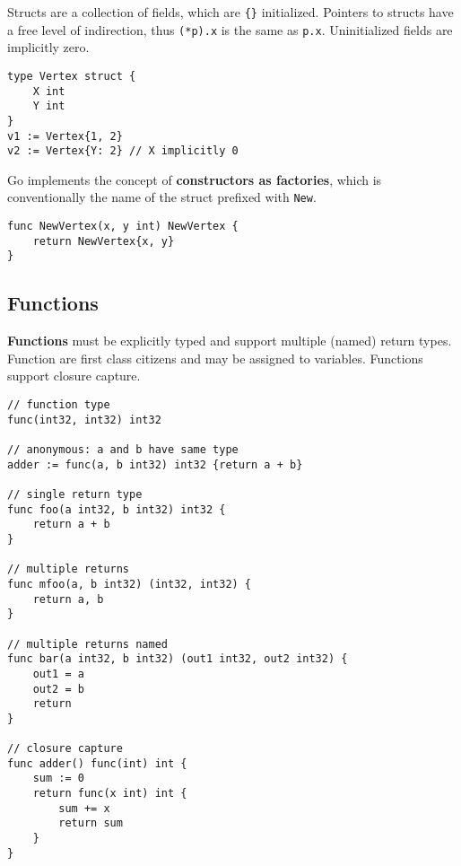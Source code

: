 \documentclass{article}
\begin{document}
\begin{paracol}{2}
Structs are a collection of fields, which are \lstinline|{}| initialized. Pointers to structs have a free level of indirection, thus \lstinline{(*p).x} is the same as \lstinline{p.x}. Uninitialized fields are implicitly zero.
\switchcolumn    


\begin{lstlisting}
type Vertex struct {
    X int
    Y int
}
v1 := Vertex{1, 2}
v2 := Vertex{Y: 2} // X implicitly 0
\end{lstlisting}

\switchcolumn*

\noindent Go implements the concept of \textbf{constructors as factories}, which is conventionally the name of the struct prefixed with \lstinline|New|.

\switchcolumn
\begin{lstlisting}
func NewVertex(x, y int) NewVertex {
    return NewVertex{x, y}
}
\end{lstlisting}

\end{paracol}

\subsection{Functions}

\noindent \textbf{Functions} must be explicitly typed and support multiple (named) return types.
Function are first class citizens and may be assigned to variables. Functions support closure capture.
\\

\begin{lstlisting}
// function type
func(int32, int32) int32

// anonymous: a and b have same type
adder := func(a, b int32) int32 {return a + b}

// single return type
func foo(a int32, b int32) int32 {
    return a + b
}

// multiple returns
func mfoo(a, b int32) (int32, int32) {
    return a, b
}

// multiple returns named
func bar(a int32, b int32) (out1 int32, out2 int32) {
    out1 = a
    out2 = b
    return
}

// closure capture
func adder() func(int) int {
    sum := 0
    return func(x int) int {
        sum += x
        return sum
    }
}
\end{lstlisting}
\end{document}
